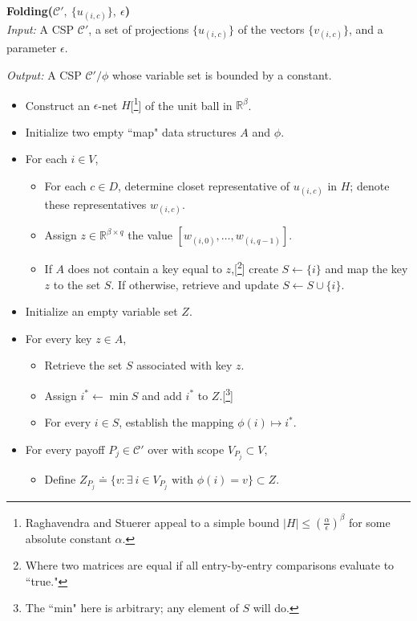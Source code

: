 \begin{algorithm} \textbf{ Folding($\mathcal{C}',~\{u_{(i,c)}\}, ~\epsilon$)} \\

\textit{Input: } A CSP $\mathcal{C}'$, a set of projections $\{u_{(i,c)}\}$ of the vectors $\{v_{(i,c)}\}$, and a parameter $\epsilon$. 

\textit{Output: } A CSP $\mathcal{C}'/\phi$ whose variable set is bounded by a constant.

\begin{itemize}
\item Construct an $\epsilon$-net $H$[\footnote{Raghavendra and Stuerer appeal to a simple bound $|H| \leq \left(\frac{\alpha}{\epsilon}\right)^\beta$ for some absolute constant $\alpha$.}] of the unit ball in $\mathbb{R}^\beta$.
\item Initialize two empty ``map" data structures $A$ and $\phi$.
\item For each $i \in V$, 
	\begin{itemize}
	\item For each $c \in D$, determine closet representative of $u_{(i,c)}$ in $H$;
		denote these representatives $w_{(i,c)}$. 
	\item Assign $z \in \mathbb{R}^{\beta \times q}$ the value $ [w_{(i,0)},  \ldots, w_{(i,q-1)}]$.
	\item If $A$ does not contain a key equal to $z$,[\footnote{Where two matrices are equal if all entry-by-entry comparisons evaluate to ``true."}] create $S \leftarrow \{i\}$ and map the key $z$ to the set $S$. 
		If otherwise, retrieve and update $S \leftarrow S\cup\{i\}$.
	\end{itemize}
\item Initialize an empty variable set $Z$.
\item For every key $z \in A$, 
	\begin{itemize}
	\item Retrieve the set $S$ associated with key $z$. 
	\item Assign $i^* \leftarrow \min S$ and add $i^*$ to $Z$.[\footnote{The ``min" here is arbitrary; any element of $S$ will do.}]
	\item For every $i \in S$, establish the mapping $\phi(i) \mapsto i^*$.
	\end{itemize}
\item For every payoff $P_j \in \mathcal{C}'$ over with scope $V_{P_j} \subset V$, 
	\begin{itemize}
	\item Define $Z_{P_j} \doteq \{v : \exists ~ i \in V_{P_j}\text{ with } \phi(i) = v \} \subset Z$.

\end{itemize}
\end{itemize}
\end{algorithm}
